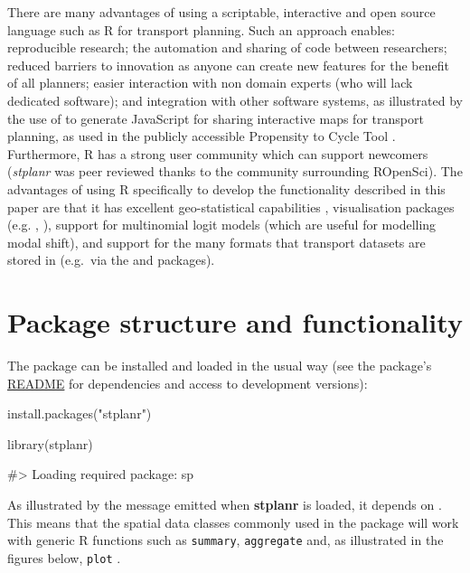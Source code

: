 There are many advantages of using a scriptable, interactive and open source
language such as R for transport planning.
Such an approach enables:
reproducible research; the automation and sharing of
code between researchers;
reduced barriers to innovation as anyone can create new features for the benefit of all planners;
easier interaction with non domain experts (who will lack dedicated software);
and integration with other
software systems, as illustrated by the use of 
to generate JavaScript for sharing interactive maps for transport planning,
as used in the publicly accessible Propensity to Cycle Tool \citep{lovelace_propensity_2017}.
Furthermore, R has a strong user community which can support newcomers
(\emph{stplanr} was peer reviewed thanks to the community surrounding ROpenSci).
The advantages of using R specifically to develop the
functionality described in this paper are that it has excellent
geo-statistical capabilities \citep{pebesma_software_2015},
visualisation packages (e.g. , ),
support for multinomial logit models (which are useful for modelling modal shift),
and support for the many formats that transport datasets are stored in (e.g.~via the
 and  packages).

\section{Package structure and
functionality}\label{package-structure-and-functionality}

The package can be installed and loaded in the usual way (see the
package's \href{https://github.com/ropensci/stplanr}{README} for
dependencies and access to development versions):

\begin{Schunk}
\begin{Sinput}
install.packages("stplanr")
\end{Sinput}
\end{Schunk}

\begin{Schunk}
\begin{Sinput}
library(stplanr)
\end{Sinput}
\begin{Soutput}
#> Loading required package: sp
\end{Soutput}
\end{Schunk}

As illustrated by the message emitted when \textbf{stplanr} is loaded,
it depends on . This means that the spatial data classes
commonly used in the package will work with generic R functions such as
\texttt{summary}, \texttt{aggregate} and, as illustrated in the figures
below, \texttt{plot} \citep{bivand_applied_2013}.

